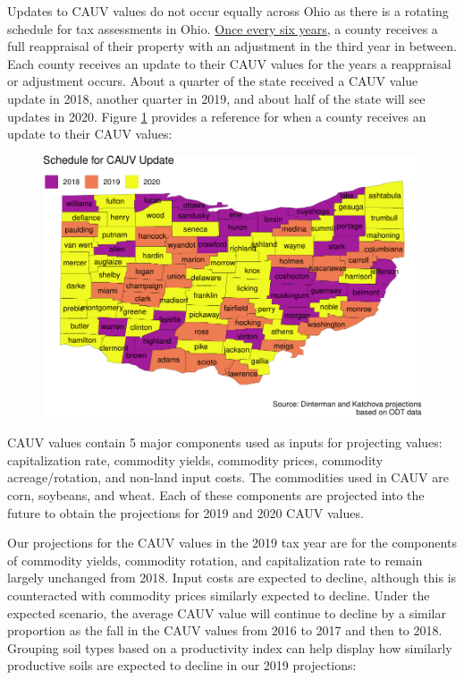 \documentclass[]{article}
\begin{document}
Updates to CAUV values do not occur equally across Ohio as there is a
rotating schedule for tax assessments in Ohio.
\href{https://www.tax.ohio.gov/real_estate/reappraisal_and_triennial_update.aspx}{Once
every six years}, a county receives a full reappraisal of their property
with an adjustment in the third year in between. Each county receives an
update to their CAUV values for the years a reappraisal or adjustment
occurs. About a quarter of the state received a CAUV value update in
2018, another quarter in 2019, and about half of the state will see
updates in 2020. Figure \ref{fig:update-map} provides a reference for
when a county receives an update to their CAUV values:

\begin{figure}[H]
\includegraphics[width=1\linewidth]{4-projections-2019-2020_files/figure-latex/update-map-1} \caption{\label{fig:update-map}}\label{fig:update-map}
\end{figure}

CAUV values contain 5 major components used as inputs for projecting
values: capitalization rate, commodity yields, commodity prices,
commodity acreage/rotation, and non-land input costs. The commodities
used in CAUV are corn, soybeans, and wheat. Each of these components are
projected into the future to obtain the projections for 2019 and 2020
CAUV values.

Our projections for the CAUV values in the 2019 tax year are for the
components of commodity yields, commodity rotation, and capitalization
rate to remain largely unchanged from 2018. Input costs are expected to
decline, although this is counteracted with commodity prices similarly
expected to decline. Under the expected scenario, the average CAUV value
will continue to decline by a similar proportion as the fall in the CAUV
values from 2016 to 2017 and then to 2018. Grouping soil types based on
a productivity index can help display how similarly productive soils are
expected to decline in our 2019 projections:
\end{document}
